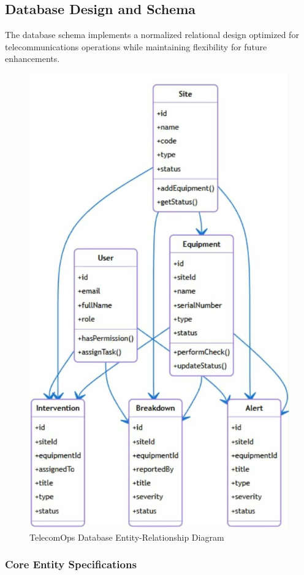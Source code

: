\subsection{Database Design and Schema}

The database schema implements a normalized relational design optimized for telecommunications operations while maintaining flexibility for future enhancements.

\begin{figure}[H]
    \centering
    \includegraphics[width=0.85\linewidth]{img/chap_02/database_er_diagram.png}
    \caption{TelecomOps Database Entity-Relationship Diagram}
    \label{fig:database_er_diagram}
\end{figure}

\subsubsection{Core Entity Specifications}

